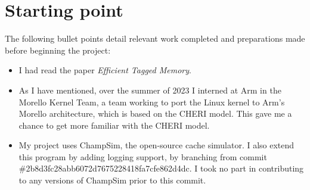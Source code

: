 \section{Starting point}
The following bullet points detail relevant work completed and preparations made before beginning the project:
\begin{itemize}
	\item I had read the paper \textit{Efficient Tagged Memory}.
	\item As I have mentioned, over the summer of 2023 I interned at Arm in the Morello Kernel Team, a team working to port the Linux kernel to Arm’s Morello architecture, which is based on the CHERI model. This gave me a chance to get more familiar with the CHERI model.
	\item My project uses ChampSim, the open-source cache simulator. I also extend this program by adding logging support, by branching from commit \#2b8d3fc28abb6072d7675228418fa7cfe862d4dc. I took no part in contributing to any versions of ChampSim prior to this commit.
\end{itemize}
